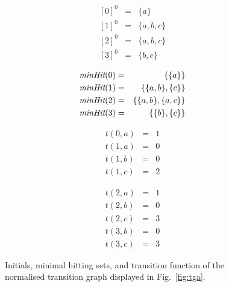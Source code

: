 \documentclass[3p,times]{elsarticle}
\newcommand{\minhits}{\text{\it minHit}}
\begin{document}
\begin{figure}[ht]
\footnotesize
\begin{center}
\begin{minipage}{0.2\textwidth}
	 \begin{eqnarray*}
{ }[0]^0 & = & \{ a \} \\
{ }[1]^0 & = & \{ a,b,c \} \\
{ }[2]^0 & = & \{ a,b,c \} \\
{ }[3]^0 & = & \{ b,c \}
\end{eqnarray*}
	\end{minipage}
	\hfill
	\begin{minipage}{0.33\textwidth}
	 \begin{eqnarray*}
\minhits(0) & = & \{ \{ a\} \} \\
\minhits(1) & = & \{ \{a,b\}, \{c\} \} \\
\minhits(2) & = & \{  \{a,b\},  \{a,c\}\} \\
\minhits(3) & = & \{ \{ b\}, \{c\} \}
\end{eqnarray*}

	\end{minipage}
	\hfill
	\begin{minipage}{0.2\textwidth}
	 \begin{eqnarray*}
t(0,a) & = & 1 \\
t(1,a) & = & 0 \\
t(1,b) & = & 0 \\
t(1,c) & = & 2
\end{eqnarray*}
	\end{minipage}
		\hfill
	\begin{minipage}{0.2\textwidth}
	 \begin{eqnarray*}
t(2,a) & = & 1 \\
t(2,b) & = & 0 \\
t(2,c) & = & 3 \\
t(3,b) & = & 0 \\
t(3,c) &  =& 3
\end{eqnarray*}
	\end{minipage}
\caption{Initials, minimal hitting sets, and transition function of the normalised transition graph displayed in Fig.~\ref{fig:tga}.}
\label{fig:initialsminhitstrans}
\end{center}
\normalsize
\end{figure}
\end{document}
